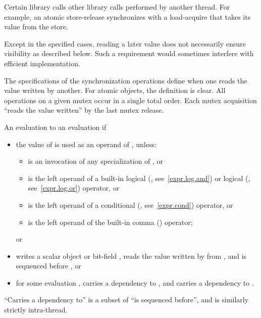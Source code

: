 \pnum
Certain library calls  other library calls performed by
another thread. For example, an atomic store-release synchronizes with a
load-acquire that takes its value from the store.
\begin{note}
Except in the specified cases, reading a later value does not
necessarily ensure visibility as described below. Such a requirement would
sometimes interfere with efficient implementation.
\end{note}
\begin{note}
The
specifications of the synchronization operations define when one reads the value
written by another. For atomic objects, the definition is clear. All operations
on a given mutex occur in a single total order. Each mutex acquisition ``reads
the value written'' by the last mutex release.
\end{note}

\pnum
An evaluation   to an evaluation  if
\begin{itemize}
\item
the value of  is used as an operand of , unless:
\begin{itemize}
\item
{} is an invocation of any specialization of
, or
\item
{} is the left operand of a built-in logical  (\tcode{\&\&},
see~\ref{expr.log.and}) or logical  (\tcode{||}, see~\ref{expr.log.or})
operator, or
\item
{} is the left operand of a conditional (, see~\ref{expr.cond})
operator, or
\item
{} is the left operand of the built-in comma (\tcode{,})
operator; \end{itemize} or
\item
{} writes a scalar object or bit-field ,  reads the value
written by  from , and  is sequenced before , or
\item
for some evaluation ,  carries a dependency to , and
 carries a dependency to .
\end{itemize}
\begin{note}
``Carries a dependency to'' is a subset of ``is sequenced before'',
and is similarly strictly intra-thread.
\end{note}

